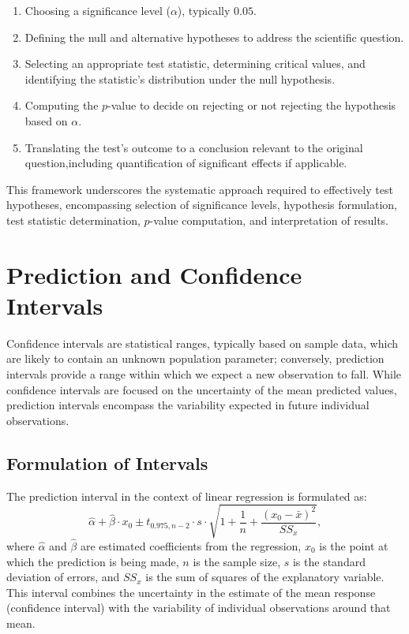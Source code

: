 \documentclass{article}
\begin{document}
\begin{enumerate}
    \item Choosing a significance level ($\alpha$), typically $0.05$.
    \item Defining the null and alternative hypotheses to address the scientific question.
    \item Selecting an appropriate test statistic, determining critical values, and identifying the statistic's distribution under the null hypothesis.
    \item Computing the $p$-value to decide on rejecting or not rejecting the hypothesis based on $\alpha$.
    \item Translating the test's outcome to a conclusion relevant to the original question,including quantification of significant effects if applicable.
\end{enumerate}

This framework underscores the systematic approach required to effectively test hypotheses, encompassing selection of significance levels, hypothesis formulation, test statistic determination, $p$-value computation, and interpretation of results.

\section{Prediction and Confidence Intervals}

Confidence intervals are statistical ranges, typically based on sample data, which are likely to contain an unknown population parameter; conversely, prediction intervals provide a range within which we expect a new observation to fall. While confidence intervals are focused on the uncertainty of the mean predicted values, prediction intervals encompass the variability expected in future individual observations.

\subsection{Formulation of Intervals}
The prediction interval in the context of linear regression is formulated as:
\[
\hat{\alpha} + \hat{\beta} \cdot x_0 \pm t_{0.975, n-2} \cdot s \cdot \sqrt{1 + \frac{1}{n} + \frac{(x_0 - \bar{x})^2}{SS_x}},
\]
where $\hat{\alpha}$ and $\hat{\beta}$ are estimated coefficients from the regression, $x_0$ is the point at which the prediction is being made, $n$ is the sample size, $s$ is the standard deviation of errors, and $SS_x$ is the sum of squares of the explanatory variable. This interval combines the uncertainty in the estimate of the mean response (confidence interval) with the variability of individual observations around that mean.
\end{document}
